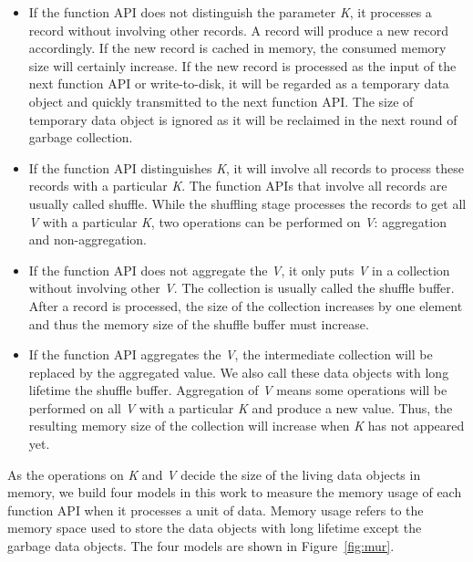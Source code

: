 \begin{itemize}

\item If the function API does not distinguish the parameter \textit{K}, it processes a record without involving other records. A record will produce a new record accordingly. If the new record is cached in memory, the consumed memory size will certainly increase. If the new record is processed as the input of the next function API or write-to-disk, it will be regarded as a temporary data object and quickly transmitted to the next function API. The size of temporary data object is ignored as it will be reclaimed in the next round of garbage collection.

\item If the function API distinguishes \textit{K}, it will involve all records to process these records with a particular \textit{K}. The function APIs that involve all records are usually called shuffle. While the shuffling stage processes the records to get all \textit{V} with a particular \textit{K}, two operations can be performed on \textit{V}: aggregation and non-aggregation.

\item If the function API does not aggregate the \textit{V}, it only puts \textit{V} in a collection without involving other \textit{V}. 
The collection is usually called the shuffle buffer. After a record is processed, the size of the collection increases by one element and thus the memory size of the shuffle buffer must increase.

\item If the function API aggregates the \textit{V}, the intermediate collection will be replaced by the aggregated value. We also call these data objects with long lifetime the shuffle buffer. Aggregation of \textit{V} means some operations will be performed on all \textit{V} with a particular \textit{K} and produce a new value. Thus, the resulting memory size of the collection will increase when \textit{K} has not appeared yet.

\end{itemize}

As the operations on \textit{K} and \textit{V} decide the size of the living data objects in memory, we build four models in this work to measure the memory usage of each function API when it processes a unit of data. 
Memory usage refers to the memory space used to store the data objects with long lifetime except the garbage data objects. The four models are shown in Figure~\ref{fig:mur}. 


